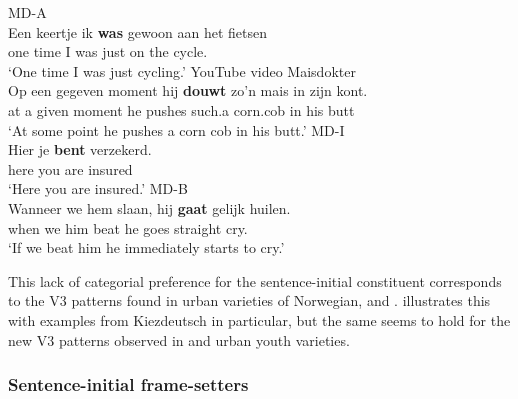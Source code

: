 \documentclass[output=paper]{langsci/langscibook}
\begin{document}
\ea
    \ea MD-A\label{exDP1}\\
    \gll Een keertje ik \textbf{was} gewoon aan het fietsen\\
    one time I was just on the cycle.\Inf{}\\
    \trans \enquote*{One time I was just cycling.}
    \ex YouTube video Maisdokter\\
    \gll\label{exPP}Op een gegeven moment hij \textbf{douwt} zo'n mais in zijn kont.\\
    at a given moment he pushes such.a corn.cob in his butt\\
    \trans \enquote*{At some point he pushes a corn cob in his butt.}
    \ex MD-I\\
    \gll\label{exAP}Hier je \textbf{bent} verzekerd.\\
    here you are insured\\
    \trans \enquote*{Here you are insured.}
    \ex MD-B\\
    \gll\label{exCP}Wanneer we hem slaan, hij \textbf{gaat} gelijk huilen.\\
    when we him beat he goes straight cry.\Inf{}\\
    \trans \enquote*{If we beat him he immediately starts to cry.}
    \z
\z

\noindent This lack of categorial preference for the sentence-initial
constituent corresponds to the V3 patterns found in urban varieties of
Norwegian,  and . \citet{Walkden:2017} illustrates this with
examples from Kiezdeutsch in particular, but the same seems to hold for the new
V3 patterns observed in  and  urban youth varieties.

\subsubsection{Sentence-initial frame-setters}
\end{document}
